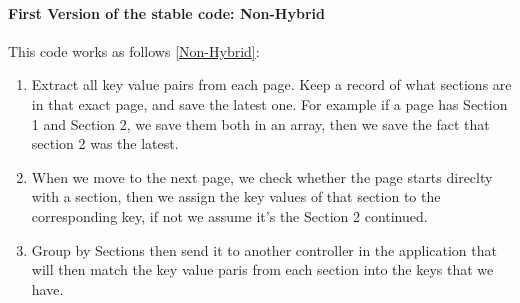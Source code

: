 \documentclass[a4paper,12pt,twoside]{report}
\begin{document}
\paragraph{First Version of the stable code: Non-Hybrid}
This code works as follows \ref{Non-Hybrid}: 
\begin{enumerate}
\item Extract all key value pairs from each page. Keep a record of what sections are in that exact page, and save the latest one. For example if a page has Section 1 and Section 2, we save them both in an array, then we save the fact that section 2 was the latest. 
\item When we move to the next page, we check whether the page starts direclty with a section, then we assign the key values of that section to the corresponding key, if not we assume it's the Section 2 continued.
\item Group by Sections then send it to another controller in the application that will then match the key value paris from each section into the keys that we have.
\end{enumerate}
\end{document}
